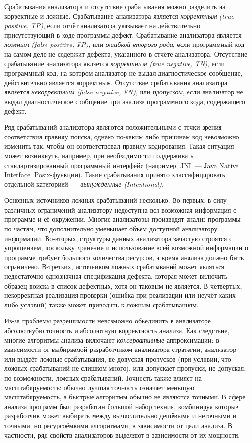 Срабатывания анализатора и отсутствие срабатывания можно разделить на корректные и ложные. Срабатывание анализатора является \textit{корректным (true positive, TP)}, если отчёт анализатора указывает на действительно присутствующий в коде программы дефект. Срабатывание анализатора является \textit{ложным (false positive, FP)}, или \textit{ошибкой второго рода}, если программный код на самом деле не содержит дефекта, указанного в отчёте анализатора. Отсутствие срабатывание анализатора является \textit{корректным (true negative, TN)}, если программный код, на котором анализатор не выдал диагностическое сообщение, действительно является корректным. Отсутствие срабатывания анализатора является \textit{некорректным (false negative, FN)}, или \textit{пропуском}, если анализатор не выдал диагностическое сообщение при анализе программного кода, содержащего дефект.

Ряд срабатываний анализатора являются положительными с точки зрения соответствия правилу поиска, однако по-каким либо причинам код невозможно изменить так, чтобы он соответствовал правилу кодирования. Такая ситуация может возникнуть, например, при необходимости поддерживать стандартизированный программный интерфейс (например, JNI~--- Java Native Interface, Posix-функции). Такие срабатывания принято классифицировать отдельной категорией~--- \textit{вынужденные (Intentional)}.

Основных источников ложных срабатываний несколько. Во-первых, в силу различных ограничений анализатору недоступна вся возможная информация о программе и её окружении. Многие анализаторы производят анализ программы по частям, что дополнительно уменьшает объём доступной анализатору информации. Во-вторых,  структуры данных анализатора зачастую строятся с упрощением, поскольку хранение и использование всей возможной информации о программе требует большого количества ресурсов, а время анализа должно быть ограничено. В-третьих, источником ложных срабатываний может являться недостаточно однозначная спецификация дефекта, которая может включить образец поиска в список дефектных, хотя он таковым не является. В-четвёртых, некорректная реализация проверки (ошибка при реализации или неучёт каких-либо условий) также может приводить к ложным срабатываниям.

Из-за проблемы разрешимости невозможно объединить в анализаторе абсолютнубю точность и абсолютную корректность анализа. Как следствие, многие алгоритмы анализа включают \textit{консервативные} аппроксимации: в зависимости от выбираемой разработчиком анализатора стратегии, анализатор или выдаёт ложные срабатывания, не допуская пропусков (при условии, что ложных срабатываний не слишком много), или допускает пропуски, не допуская, по возможности, ложных срабатываний. Точность также влияет на масштабируемость: обычно лучшая точность означает меньшую масштабируемость, а быстрые алгоритмы обычно не являются точными. В сфере анализа программ был разработан большой набор техник, комбинируя которые разработчик может выбирать между вычислительно дешёвыми и неточными  и точными, но ресурсоёмкими алгоритмами, в зависимости от цели анализа. В частности, ряд свойств анализаторов выделяют в зависимости от их мощности.

